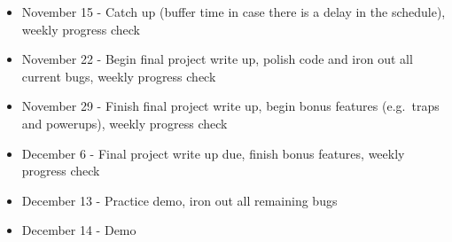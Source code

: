 \documentclass{article}
\begin{document}
\begin{itemize}
  \item November 15 - Catch up (buffer time in case there is a delay 
    in the schedule), weekly progress check
  \item November 22 - Begin final project write up, polish code and iron out all current bugs, 
    weekly progress check
  \item November 29 - Finish final project write up, begin bonus features (e.g.\ traps and powerups),
    weekly progress check
  \item December 6 - Final project write up due, finish bonus features, weekly progress check
  \item December 13 - Practice demo, iron out all remaining bugs
  \item December 14 - Demo
\end{itemize}
\end{document}
